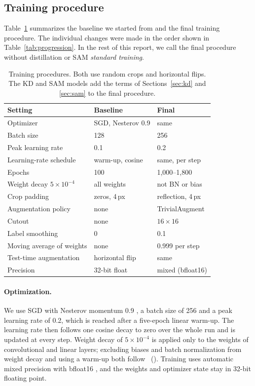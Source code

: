 \documentclass[letterpaper]{article}
\begin{document}
\subsection{Training procedure}
\label{sec:recipe}
Table~\ref{tab:recipes} summarizes the baseline we started from and the final training procedure. The individual changes were
made in the order shown in Table~\ref{tab:progression}. In the rest of this report, we call the final procedure without
distillation or SAM \emph{standard training}.

\begin{table}[t]
\centering
\footnotesize
\setlength{\tabcolsep}{3pt}
\begin{tabular}{@{}lll@{}}
\toprule
Setting & Baseline & Final \\
\midrule
Optimizer & SGD, Nesterov 0.9 & same \\
Batch size & 128 & 256 \\
Peak learning rate & 0.1 & 0.2 \\
Learning-rate schedule & warm-up, cosine & same, per step \\
Epochs & 100 & 1,000--1,800 \\
Weight decay $5{\times}10^{-4}$ & all weights & not BN or bias \\
Crop padding & zeros, 4\,px & reflection, 4\,px \\
Augmentation policy & none & TrivialAugment \\
Cutout & none & $16{\times}16$ \\
Label smoothing & 0 & 0.1 \\
Moving average of weights & none & 0.999 per step \\
Test-time augmentation & horizontal flip & same \\
Precision & 32-bit float & mixed (bfloat16) \\
\bottomrule
\end{tabular}
\caption{Training procedures. Both use random crops and horizontal flips. The KD and SAM models add the terms of
Sections~\ref{sec:kd} and \ref{sec:sam} to the final procedure.}
\label{tab:recipes}
\end{table}

\paragraph{Optimization.} We use SGD with Nesterov momentum 0.9 \cite{sutskever2013importance}, a batch size of 256 and a peak
learning rate of 0.2, which is reached after a five-epoch linear warm-up. The learning rate then follows one cosine decay to
zero over the whole run \cite{loshchilov2017sgdr} and is updated at every step. Weight decay of $5{\times}10^{-4}$ is applied
only to the weights of convolutional and linear layers; excluding biases and batch normalization from weight decay and using a
warm-up both follow \citeauthor{he2019bag}~(\citeyear{he2019bag}). Training uses automatic mixed precision with bfloat16
\cite{micikevicius2018mixed}, and the weights and optimizer state stay in 32-bit floating point.
\end{document}
